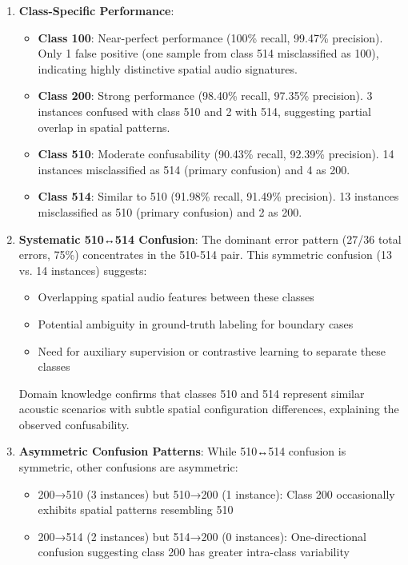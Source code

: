 \documentclass[11pt,a4paper]{article}
\begin{document}
\begin{enumerate}[leftmargin=*]
\item \textbf{Class-Specific Performance}:
\begin{itemize}
\item \textbf{Class 100}: Near-perfect performance (100\% recall, 99.47\% precision). Only 1 false positive (one sample from class 514 misclassified as 100), indicating highly distinctive spatial audio signatures.
\item \textbf{Class 200}: Strong performance (98.40\% recall, 97.35\% precision). 3 instances confused with class 510 and 2 with 514, suggesting partial overlap in spatial patterns.
\item \textbf{Class 510}: Moderate confusability (90.43\% recall, 92.39\% precision). 14 instances misclassified as 514 (primary confusion) and 4 as 200.
\item \textbf{Class 514}: Similar to 510 (91.98\% recall, 91.49\% precision). 13 instances misclassified as 510 (primary confusion) and 2 as 200.
\end{itemize}

\item \textbf{Systematic 510↔514 Confusion}: The dominant error pattern (27/36 total errors, 75\%) concentrates in the 510-514 pair. This symmetric confusion (13 vs. 14 instances) suggests:
\begin{itemize}
\item Overlapping spatial audio features between these classes
\item Potential ambiguity in ground-truth labeling for boundary cases
\item Need for auxiliary supervision or contrastive learning to separate these classes
\end{itemize}

Domain knowledge confirms that classes 510 and 514 represent similar acoustic scenarios with subtle spatial configuration differences, explaining the observed confusability.

\item \textbf{Asymmetric Confusion Patterns}: While 510↔514 confusion is symmetric, other confusions are asymmetric:
\begin{itemize}
\item 200→510 (3 instances) but 510→200 (1 instance): Class 200 occasionally exhibits spatial patterns resembling 510
\item 200→514 (2 instances) but 514→200 (0 instances): One-directional confusion suggesting class 200 has greater intra-class variability
\end{itemize}


\end{enumerate}
\end{document}
